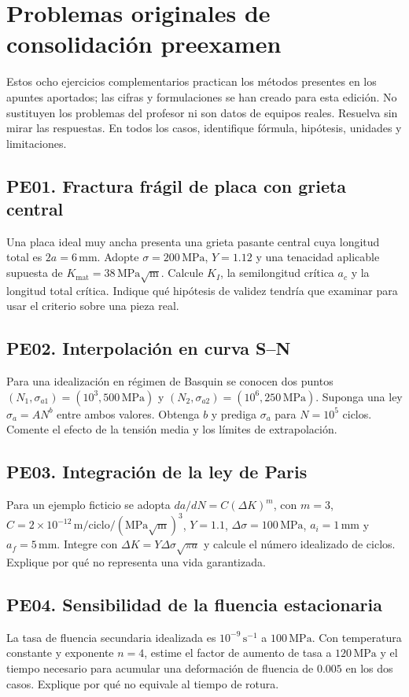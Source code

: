 \chapter{Problemas originales de consolidación preexamen}
\label{ch:problemas-preexamen}
\noindent Estos ocho ejercicios complementarios practican los métodos presentes en los apuntes aportados; las cifras y formulaciones se han creado para esta edición. No sustituyen los problemas del profesor ni son datos de equipos reales. Resuelva sin mirar las respuestas. En todos los casos, identifique fórmula, hipótesis, unidades y limitaciones.

\section*{PE01. Fractura frágil de placa con grieta central}
Una placa ideal muy ancha presenta una grieta pasante central cuya longitud total es $2a=6\,\mathrm{mm}$. Adopte $\sigma=200\,\mathrm{MPa}$, $Y=1.12$ y una tenacidad aplicable supuesta de $K_{\mathrm{mat}}=38\,\mathrm{MPa\sqrt m}$. Calcule $K_I$, la semilongitud crítica $a_c$ y la longitud total crítica. Indique qué hipótesis de validez tendría que examinar para usar el criterio sobre una pieza real.

\section*{PE02. Interpolación en curva S--N}
Para una idealización en régimen de Basquin se conocen dos puntos $(N_1,\sigma_{a1})=(10^3,500\,\mathrm{MPa})$ y $(N_2,\sigma_{a2})=(10^6,250\,\mathrm{MPa})$. Suponga una ley $\sigma_a=A N^b$ entre ambos valores. Obtenga $b$ y prediga $\sigma_a$ para $N=10^5$ ciclos. Comente el efecto de la tensión media y los límites de extrapolación.

\section*{PE03. Integración de la ley de Paris}
Para un ejemplo ficticio se adopta $da/dN=C(\Delta K)^m$, con $m=3$, $C=2\times10^{-12}\,\mathrm{m/ciclo}/(\mathrm{MPa\sqrt m})^3$, $Y=1.1$, $\Delta\sigma=100\,\mathrm{MPa}$, $a_i=1\,\mathrm{mm}$ y $a_f=5\,\mathrm{mm}$. Integre con $\Delta K=Y\Delta\sigma\sqrt{\pi a}$ y calcule el número idealizado de ciclos. Explique por qué no representa una vida garantizada.

\section*{PE04. Sensibilidad de la fluencia estacionaria}
La tasa de fluencia secundaria idealizada es $10^{-9}\,\mathrm{s^{-1}}$ a $100\,\mathrm{MPa}$. Con temperatura constante y exponente $n=4$, estime el factor de aumento de tasa a $120\,\mathrm{MPa}$ y el tiempo necesario para acumular una deformación de fluencia de $0.005$ en los dos casos. Explique por qué no equivale al tiempo de rotura.


